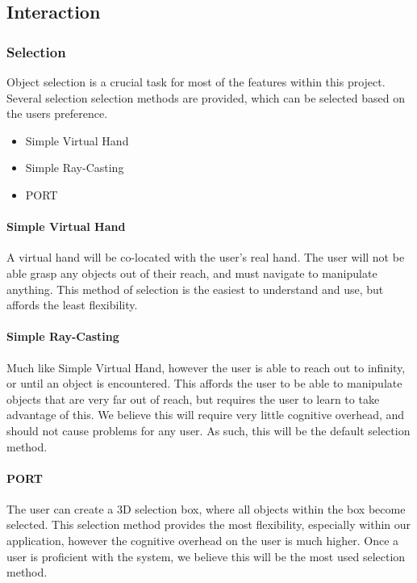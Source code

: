 \subsection{Interaction}
\label{Design:Interaction}

\subsubsection{Selection}
\label{Design:Interaction:Selection}
Object selection is a crucial task for most of the features within this project.
Several selection selection methods are provided, which can be selected based on the users preference.
\begin{itemize}
	\item Simple Virtual Hand
	\item Simple Ray-Casting
	\item PORT
\end{itemize}

\paragraph{Simple Virtual Hand}
A virtual hand will be co-located with the user's real hand.
The user will not be able grasp any objects out of their reach, and must navigate to manipulate anything.
This method of selection is the easiest to understand and use, but affords the least flexibility.

\paragraph{Simple Ray-Casting}
Much like Simple Virtual Hand, however the user is able to reach out to infinity, or until an object is encountered.
This affords the user to be able to manipulate objects that are very far out of reach, but requires the user to learn to take advantage of this.
We believe this will require very little cognitive overhead, and should not cause problems for any user.
As such, this will be the default selection method.

\paragraph{PORT}
The user can create a 3D selection box, where all objects within the box become selected.
This selection method provides the most flexibility, especially within our application, however the cognitive overhead on the user is much higher.
Once a user is proficient with the system, we believe this will be the most used selection method.

